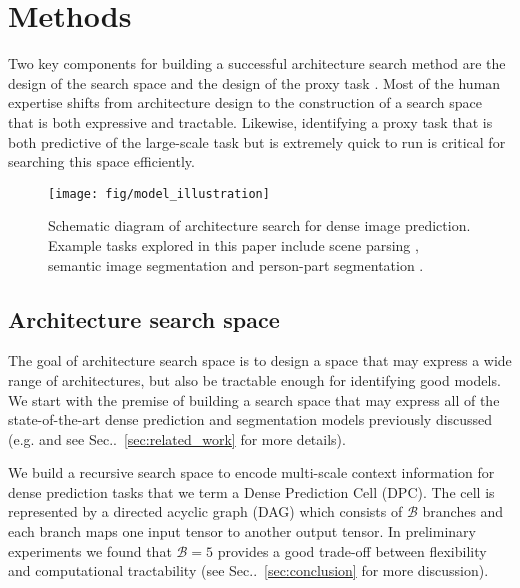 \documentclass{article}
\makeatletter
\def\@onedot{\ifx\@let@token.\else.\null\fi\xspace}
\DeclareRobustCommand\onedot{\futurelet\@let@token\@onedot}
\newcommand{\secref}[1]{Sec\onedot~\ref{#1}}
\makeatother
\begin{document}
 \section{Methods}
\label{sec:methods}
Two key components for building a successful architecture search method are the design of the search space and the design of the proxy task \cite{zoph2017neural,zoph2017learning}. Most of the human expertise shifts from architecture design to the construction of a search space that is both expressive and tractable. Likewise, identifying a proxy task that is both predictive of the large-scale task but is extremely quick to run is critical for searching this space efficiently.



\setlength{\intextsep}{0pt}
\begin{wrapfigure}{R}{3in}
    \centering
    \texttt{[image: fig/model\_illustration]}
    \caption{Schematic diagram of architecture search for dense image prediction. Example tasks explored in this paper include scene parsing \cite{Cordts2016Cityscapes}, semantic image segmentation \cite{everingham2014pascal} and person-part segmentation \cite{chen_cvpr14}.}
    \label{fig:model_illustration}
\end{wrapfigure}




\subsection{Architecture search space}
\label{sec:search_space}

The goal of architecture search space is to design a space that may express a wide range of architectures, but also be tractable enough for identifying good models. We start with the premise of building a search space that may express all of the state-of-the-art dense prediction and segmentation models previously discussed (e.g. \cite{chen2017rethinking, zhao2017pyramid} and see \secref{sec:related_work} for more details).

We build a recursive search space to encode multi-scale context information for dense prediction tasks that we term a Dense Prediction Cell (DPC). The cell is represented by a directed acyclic graph (DAG) which consists of $\mathcal{B}$ branches and each branch maps one input tensor to another output tensor. In preliminary experiments we found that $\mathcal{B}=5$ provides a good trade-off between flexibility and computational tractability (see \secref{sec:conclusion} for more discussion).
\end{document}
